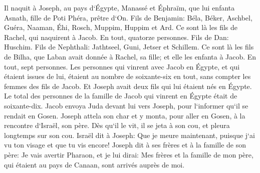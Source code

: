 \verse Il naquit à Joseph, au pays d`Égypte, Manassé et Éphraïm, que lui enfanta Asnath, fille de Poti Phéra, prêtre d`On. 
\verse Fils de Benjamin: Béla, Béker, Aschbel, Guéra, Naaman, Éhi, Rosch, Muppim, Huppim et Ard. 
\verse Ce sont là les fils de Rachel, qui naquirent à Jacob. En tout, quatorze personnes. 
\verse Fils de Dan: Huschim. 
\verse Fils de Nephthali: Jathtseel, Guni, Jetser et Schillem. 
\verse Ce sont là les fils de Bilha, que Laban avait donnée à Rachel, sa fille; et elle les enfanta à Jacob. En tout, sept personnes. 
\verse Les personnes qui vinrent avec Jacob en Égypte, et qui étaient issues de lui, étaient au nombre de soixante-six en tout, sans compter les femmes des fils de Jacob. 
\verse Et Joseph avait deux fils qui lui étaient nés en Égypte. Le total des personnes de la famille de Jacob qui vinrent en Égypte était de soixante-dix. 
\verse Jacob envoya Juda devant lui vers Joseph, pour l`informer qu`il se rendait en Gosen. 
\verse Joseph attela son char et y monta, pour aller en Gosen, à la rencontre d`Israël, son père. Dès qu`il le vit, il se jeta à son cou, et pleura longtemps sur son cou. 
\verse Israël dit à Joseph: Que je meure maintenant, puisque j`ai vu ton visage et que tu vis encore! 
\verse Joseph dit à ses frères et à la famille de son père: Je vais avertir Pharaon, et je lui dirai: Mes frères et la famille de mon père, qui étaient au pays de Canaan, sont arrivés auprès de moi. 
